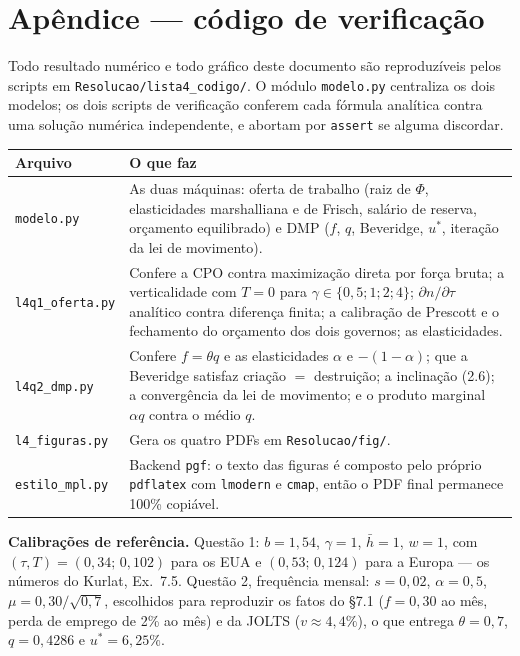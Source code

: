 \documentclass[11pt, a4paper]{article}
\newcommand{\stst}{^{\ast}}
\begin{document}
\section[Apêndice --- código]{Apêndice --- código de verificação}

Todo resultado numérico e todo gráfico deste documento são reproduzíveis pelos scripts em
\texttt{Resolucao/}\allowbreak\texttt{lista4\_codigo/}. O módulo \texttt{modelo.py}
centraliza os dois modelos;
os dois scripts de verificação conferem cada fórmula analítica contra uma solução numérica
independente, e abortam por \texttt{assert} se alguma discordar.

\begin{center}
\small
\begin{tabular}{@{}lp{10.4cm}@{}}
\toprule
\textbf{Arquivo} & \textbf{O que faz} \\
\midrule
\texttt{modelo.py} & As duas máquinas: oferta de trabalho (raiz de $\Phi$, elasticidades
  marshalliana e de Frisch, salário de reserva, orçamento equilibrado) e DMP ($f$, $q$,
  Beveridge, $u\stst$, iteração da lei de movimento). \\
\texttt{l4q1\_oferta.py} & Confere a CPO contra maximização direta por força bruta; a
  verticalidade com $T=0$ para $\gamma\in\{0{,}5;1;2;4\}$; $\partial n/\partial\tau$
  analítico contra diferença finita; a calibração de Prescott e o fechamento do orçamento
  dos dois governos; as elasticidades. \\
\texttt{l4q2\_dmp.py} & Confere $f=\theta q$ e as elasticidades $\alpha$ e $-(1-\alpha)$;
  que a Beveridge satisfaz criação $=$ destruição; a inclinação (2.6); a convergência da
  lei de movimento; e o produto marginal $\alpha q$ contra o médio $q$. \\
\texttt{l4\_figuras.py} & Gera os quatro PDFs em \texttt{Resolucao/fig/}. \\
\texttt{estilo\_mpl.py} & Backend \texttt{pgf}: o texto das figuras é composto pelo próprio
  \texttt{pdflatex} com \texttt{lmodern} e \texttt{cmap}, então o PDF final permanece
  100\% copiável. \\
\bottomrule
\end{tabular}
\end{center}

\begin{tcolorbox}[colback=gray!7, colframe=gray!50, arc=2pt, boxrule=0.4pt]
\small
\textbf{Calibrações de referência.} Questão 1: $b=1{,}54$, $\gamma=1$, $\bar h=1$, $w=1$,
com $(\tau,T) = (0{,}34;\,0{,}102)$ para os EUA e $(0{,}53;\,0{,}124)$ para a Europa ---
os números do Kurlat, Ex.\ 7.5. Questão 2, frequência mensal: $s = 0{,}02$,
$\alpha = 0{,}5$, $\mu = 0{,}30/\sqrt{0{,}7}$, escolhidos para reproduzir os fatos do
§7.1 ($f = 0{,}30$ ao mês, perda de emprego de 2\% ao mês) e da JOLTS ($v \approx 4{,}4\%$),
o que entrega $\theta = 0{,}7$, $q = 0{,}4286$ e $u\stst = 6{,}25\%$.
\end{tcolorbox}
\end{document}
